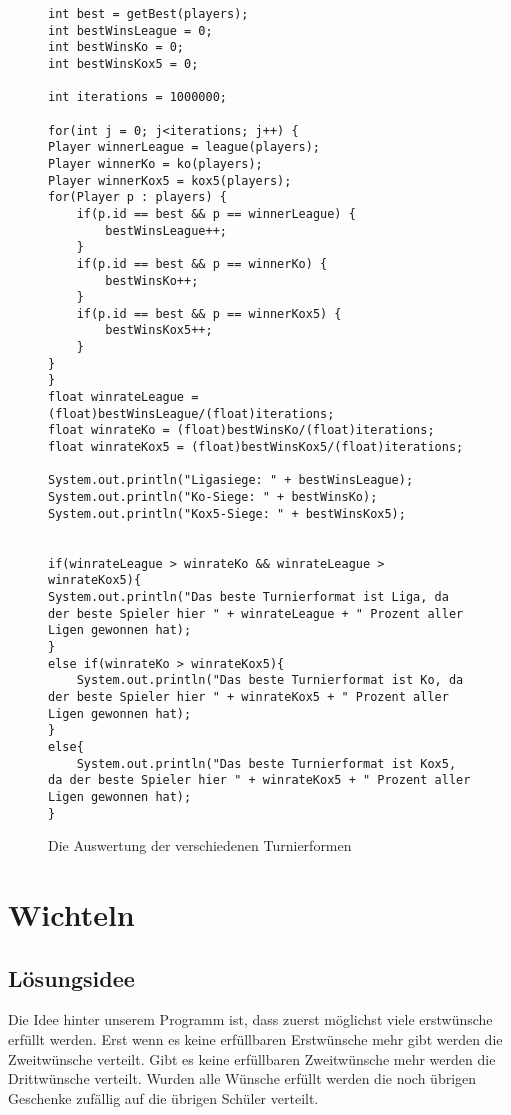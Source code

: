 \documentclass[a4paper, 12pt]{scrartcl}
\begin{document}
\begin{figure}[H]
\centering
\begin{lstlisting}
int best = getBest(players);
int bestWinsLeague = 0;
int bestWinsKo = 0;
int bestWinsKox5 = 0;

int iterations = 1000000;

for(int j = 0; j<iterations; j++) {
Player winnerLeague = league(players);
Player winnerKo = ko(players);
Player winnerKox5 = kox5(players);
for(Player p : players) {
    if(p.id == best && p == winnerLeague) {
        bestWinsLeague++;
    }
    if(p.id == best && p == winnerKo) {
        bestWinsKo++;
    }
    if(p.id == best && p == winnerKox5) {
        bestWinsKox5++;
    }
}
}
float winrateLeague = (float)bestWinsLeague/(float)iterations;
float winrateKo = (float)bestWinsKo/(float)iterations;
float winrateKox5 = (float)bestWinsKox5/(float)iterations;

System.out.println("Ligasiege: " + bestWinsLeague);
System.out.println("Ko-Siege: " + bestWinsKo);
System.out.println("Kox5-Siege: " + bestWinsKox5);


if(winrateLeague > winrateKo && winrateLeague > winrateKox5){
System.out.println("Das beste Turnierformat ist Liga, da der beste Spieler hier " + winrateLeague + " Prozent aller Ligen gewonnen hat);
}
else if(winrateKo > winrateKox5){
    System.out.println("Das beste Turnierformat ist Ko, da der beste Spieler hier " + winrateKox5 + " Prozent aller Ligen gewonnen hat);
}
else{
    System.out.println("Das beste Turnierformat ist Kox5, da der beste Spieler hier " + winrateKox5 + " Prozent aller Ligen gewonnen hat);
}

\end{lstlisting}
\caption{Die Auswertung der verschiedenen Turnierformen}
\end{figure}

\section{Wichteln}

\subsection{Lösungsidee}

Die Idee hinter unserem Programm ist, dass zuerst möglichst viele erstwünsche erfüllt werden. Erst wenn es keine erfüllbaren Erstwünsche mehr gibt werden die Zweitwünsche verteilt. Gibt es keine erfüllbaren Zweitwünsche mehr werden die Drittwünsche verteilt. Wurden alle Wünsche erfüllt werden die noch übrigen Geschenke zufällig auf die übrigen Schüler verteilt.
\end{document}

